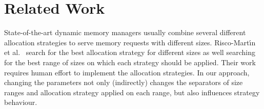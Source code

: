 \vspace{-2mm}

\section{Related Work}

State-of-the-art dynamic memory managers usually combine several
different allocation strategies to serve memory requests with different
sizes. Risco-Mart\'{\i}n et al.~\cite{RiscoMartín2014109,
Colmenar:2011:MOD:2001576.2001820} search for the best allocation strategy
for different sizes as well searching for the best range of sizes on which
each strategy should be applied. 
Their work requires human effort to implement the
allocation strategies. In our approach, changing the parameters not
only (indirectly) changes the separators of size ranges and allocation
strategy applied on each range, but also influences strategy behaviour. 



